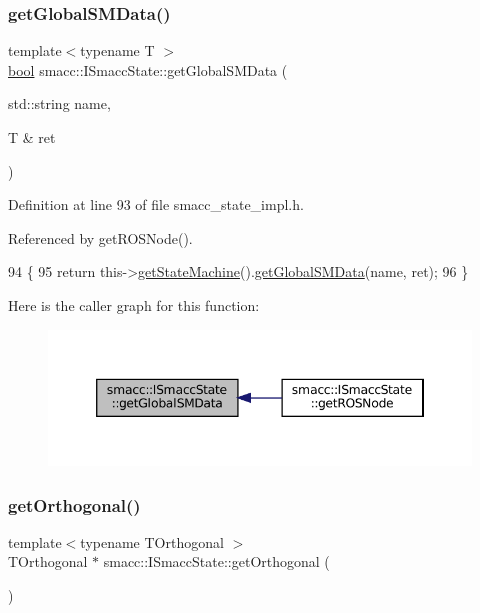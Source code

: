 \subsubsection{\texorpdfstring{get\+Global\+S\+M\+Data()}{getGlobalSMData()}}
{\footnotesize\ttfamily template$<$typename T $>$ \\
\hyperlink{classbool}{bool} smacc\+::\+I\+Smacc\+State\+::get\+Global\+S\+M\+Data (\begin{DoxyParamCaption}\item[{std\+::string}]{name,  }\item[{T \&}]{ret }\end{DoxyParamCaption})}



Definition at line 93 of file smacc\+\_\+state\+\_\+impl.\+h.



Referenced by get\+R\+O\+S\+Node().


\begin{DoxyCode}
94 \{
95     \textcolor{keywordflow}{return} this->\hyperlink{classsmacc_1_1ISmaccState_a562bb3f9a3ac16b8be71e4794c9e7523}{getStateMachine}().\hyperlink{classsmacc_1_1ISmaccStateMachine_aeda2d6813c6c428bf318a5792e014b61}{getGlobalSMData}(name, ret);
96 \}
\end{DoxyCode}
Here is the caller graph for this function\+:
\nopagebreak
\begin{figure}[H]
\begin{center}
\leavevmode
\includegraphics[width=346pt]{classsmacc_1_1ISmaccState_ad6811b03329d9e694e78bc4b1220c2c0_icgraph}
\end{center}
\end{figure}
\mbox{\label{classsmacc_1_1ISmaccState_afc5c5683cbe39964a52fc3a2553196d2}} 
\subsubsection{\texorpdfstring{get\+Orthogonal()}{getOrthogonal()}}
{\footnotesize\ttfamily template$<$typename T\+Orthogonal $>$ \\
T\+Orthogonal $\ast$ smacc\+::\+I\+Smacc\+State\+::get\+Orthogonal (\begin{DoxyParamCaption}{ }\end{DoxyParamCaption})}



